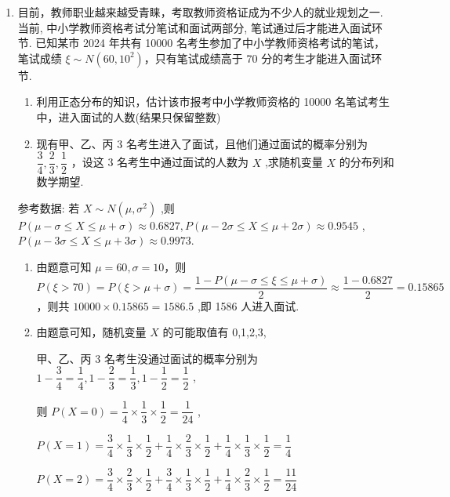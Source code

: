 \begin{enumerate}
\begin{enumerate}
        \item 目前，教师职业越来越受青睐，考取教师资格证成为不少人的就业规划之一. 当前, 中小学教师资格考试分笔试和面试两部分, 笔试通过后才能进入面试环节. 已知某市 2024 年共有 10000 名考生参加了中小学教师资格考试的笔试，笔试成绩 $\xi  \sim  N(60, 10^2)$，只有笔试成绩高于 70 分的考生才能进入面试环节.
        \begin{enumerate}
            \item 利用正态分布的知识，估计该市报考中小学教师资格的 10000 名笔试考生中，进入面试的人数(结果只保留整数)
            \item 现有甲、乙、丙 3 名考生进入了面试，且他们通过面试的概率分别为 $\dfrac{3}{4},\dfrac{2}{3},\dfrac{1}{2}$ ，设这 3 名考生中通过面试的人数为 $X$ ,求随机变量 $X$ 的分布列和数学期望.
        \end{enumerate}
        参考数据: 若 $X \sim  N\left( {\mu ,{\sigma }^{2}}\right)$ ,则 $P\left( {\mu  - \sigma  \leq  X \leq  \mu  + \sigma }\right)  \approx  {0.6827},P\left( {\mu  - {2\sigma } \leq  X \leq  \mu  + {2\sigma }}\right)  \approx  {0.9545}$ , $P\left( {\mu  - {3\sigma } \leq  X \leq  \mu  + {3\sigma }}\right)  \approx  {0.9973}.$
        \begin{jieda}
            \begin{enumerate}
                \item 由题意可知 $\mu  = {60},\sigma  = {10}$，则 $P\left( {\xi  > {70}}\right)  = P\left( {\xi  > \mu  + \sigma }\right)  = \dfrac{1 - P\left( {\mu  - \sigma  \leq  \xi  \leq  \mu  + \sigma }\right) }{2} \approx  \dfrac{1 - {0.6827}}{2} = {0.15865}$，则共 ${10000} \times  {0.15865} = {1586.5}$ ,即 1586 人进入面试.
                
                \item 由题意可知，随机变量 $X$ 的可能取值有 0,1,2,3,
                
                甲、乙、丙 3 名考生没通过面试的概率分别为 $1 - \dfrac{3}{4} = \dfrac{1}{4},1 - \dfrac{2}{3} = \dfrac{1}{3},1 - \dfrac{1}{2} = \dfrac{1}{2}$ ,
                
                则 $P\left( {X = 0}\right)  = \dfrac{1}{4} \times  \dfrac{1}{3} \times  \dfrac{1}{2} = \dfrac{1}{24}$ ,
                
                $P\left( {X = 1}\right)  = \dfrac{3}{4} \times  \dfrac{1}{3} \times  \dfrac{1}{2} + \dfrac{1}{4} \times  \dfrac{2}{3} \times  \dfrac{1}{2} + \dfrac{1}{4} \times  \dfrac{1}{3} \times  \dfrac{1}{2} = \dfrac{1}{4}$
                
                $P\left( {X = 2}\right)  = \dfrac{3}{4} \times  \dfrac{2}{3} \times  \dfrac{1}{2} + \dfrac{3}{4} \times  \dfrac{1}{3} \times  \dfrac{1}{2} + \dfrac{1}{4} \times  \dfrac{2}{3} \times  \dfrac{1}{2} = \dfrac{11}{24}$
                

\end{enumerate}
\end{jieda}
\end{enumerate}
\end{enumerate}
